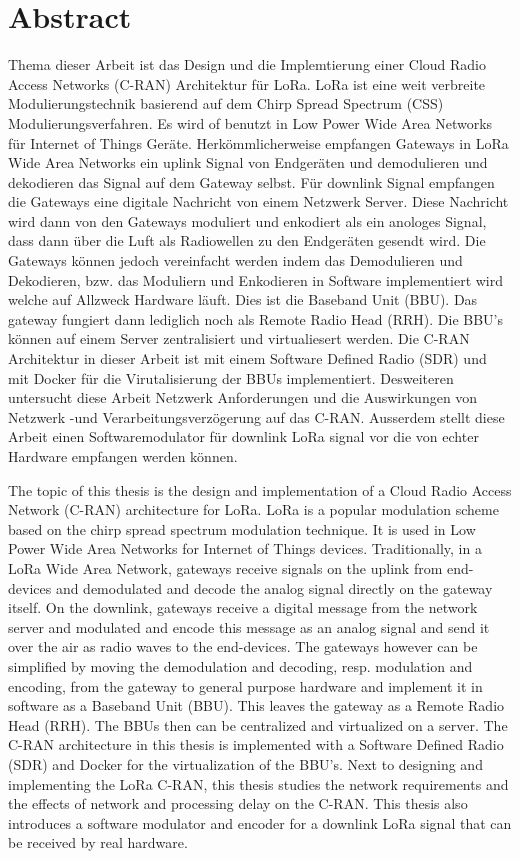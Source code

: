 \chapter*{Abstract}


Thema dieser Arbeit ist das Design und die Implemtierung einer Cloud Radio Access Networks (C-RAN)
Architektur für LoRa. LoRa ist eine weit verbreite Modulierungstechnik basierend auf dem Chirp Spread Spectrum (CSS)
Modulierungsverfahren. Es wird of benutzt in Low Power Wide Area Networks für Internet of Things Geräte. Herkömmlicherweise
empfangen Gateways in LoRa Wide Area Networks ein uplink Signal von Endgeräten und demodulieren und dekodieren das Signal
auf dem Gateway selbst. Für downlink Signal empfangen die Gateways eine digitale Nachricht von einem Netzwerk Server. Diese 
Nachricht wird dann von den Gateways moduliert und enkodiert als ein anologes Signal, dass dann über die Luft als Radiowellen
zu den Endgeräten gesendt wird. Die Gateways können jedoch vereinfacht werden indem das Demodulieren und Dekodieren, bzw. das Moduliern und Enkodieren
in Software implementiert wird welche auf Allzweck Hardware läuft. Dies ist die Baseband Unit (BBU). Das gateway fungiert dann 
lediglich noch als Remote Radio Head (RRH). Die BBU's können auf einem Server zentralisiert und virtualiesert werden.
Die C-RAN Architektur in dieser Arbeit ist mit einem Software Defined Radio (SDR) und mit Docker für die Virutalisierung der BBUs implementiert.
Desweiteren untersucht diese Arbeit Netzwerk Anforderungen und die Auswirkungen von Netzwerk -und Verarbeitungsverzögerung auf das C-RAN.
Ausserdem stellt diese Arbeit einen Softwaremodulator für downlink LoRa signal vor die von echter Hardware empfangen werden können.


The topic of this thesis is the design and implementation of a Cloud Radio Access Network (C-RAN)
architecture for LoRa. LoRa is a popular modulation scheme based on the chirp spread spectrum modulation technique. It is 
used in Low Power Wide Area Networks for Internet of Things devices. Traditionally, in a LoRa Wide Area Network, gateways receive
signals on the uplink from end-devices and demodulated and decode the analog signal directly on the gateway itself.
On the downlink, gateways receive a digital message from the network server and modulated and encode this message 
as an analog signal and send it over the air as radio waves to the end-devices.
The gateways however can be simplified by moving the demodulation and decoding, resp. modulation and encoding,
from the gateway to general purpose hardware and implement it in software as a Baseband Unit (BBU). This leaves the gateway 
as a Remote Radio Head (RRH). The BBUs then can be centralized and virtualized on a server.
The C-RAN architecture in this thesis is implemented with a Software Defined Radio (SDR) and Docker for the virtualization of 
the BBU's. Next to designing and implementing the LoRa C-RAN, this thesis studies the network requirements and the effects 
of network and processing delay on the C-RAN. This thesis also introduces a software modulator and encoder for a downlink LoRa
signal that can be received by real hardware. 


